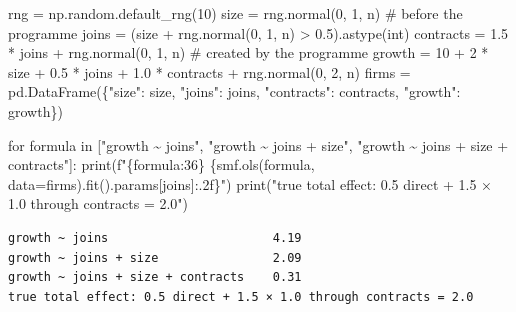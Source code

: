 \documentclass[
  letterpaper,
  10pt,
  twoside,
  openright,
  numbers=noenddot,
  chapterprefix=true]{scrbook}
\newenvironment{Shaded}{}{}
\newcommand{\BuiltInTok}[1]{\textcolor[rgb]{0.84,0.23,0.29}{#1}}
\newcommand{\CommentTok}[1]{\textcolor[rgb]{0.42,0.45,0.49}{#1}}
\newcommand{\ControlFlowTok}[1]{\textcolor[rgb]{0.84,0.23,0.29}{#1}}
\newcommand{\DecValTok}[1]{\textcolor[rgb]{0.00,0.36,0.77}{#1}}
\newcommand{\FloatTok}[1]{\textcolor[rgb]{0.00,0.36,0.77}{#1}}
\newcommand{\KeywordTok}[1]{\textcolor[rgb]{0.84,0.23,0.29}{#1}}
\newcommand{\NormalTok}[1]{\textcolor[rgb]{0.14,0.16,0.18}{#1}}
\newcommand{\OperatorTok}[1]{\textcolor[rgb]{0.14,0.16,0.18}{#1}}
\newcommand{\SpecialCharTok}[1]{\textcolor[rgb]{0.00,0.36,0.77}{#1}}
\newcommand{\SpecialStringTok}[1]{\textcolor[rgb]{0.01,0.18,0.38}{#1}}
\newcommand{\StringTok}[1]{\textcolor[rgb]{0.01,0.18,0.38}{#1}}
\begin{document}
\label{check-mediator}
\begin{Shaded}
\begin{Highlighting}[]
\NormalTok{rng }\OperatorTok{=}\NormalTok{ np.random.default\_rng(}\DecValTok{10}\NormalTok{)}
\NormalTok{size }\OperatorTok{=}\NormalTok{ rng.normal(}\DecValTok{0}\NormalTok{, }\DecValTok{1}\NormalTok{, n)                                  }\CommentTok{\# before the programme}
\NormalTok{joins }\OperatorTok{=}\NormalTok{ (size }\OperatorTok{+}\NormalTok{ rng.normal(}\DecValTok{0}\NormalTok{, }\DecValTok{1}\NormalTok{, n) }\OperatorTok{\textgreater{}} \FloatTok{0.5}\NormalTok{).astype(}\BuiltInTok{int}\NormalTok{)}
\NormalTok{contracts }\OperatorTok{=} \FloatTok{1.5} \OperatorTok{*}\NormalTok{ joins }\OperatorTok{+}\NormalTok{ rng.normal(}\DecValTok{0}\NormalTok{, }\DecValTok{1}\NormalTok{, n)               }\CommentTok{\# created by the programme}
\NormalTok{growth }\OperatorTok{=} \DecValTok{10} \OperatorTok{+} \DecValTok{2} \OperatorTok{*}\NormalTok{ size }\OperatorTok{+} \FloatTok{0.5} \OperatorTok{*}\NormalTok{ joins }\OperatorTok{+} \FloatTok{1.0} \OperatorTok{*}\NormalTok{ contracts }\OperatorTok{+}\NormalTok{ rng.normal(}\DecValTok{0}\NormalTok{, }\DecValTok{2}\NormalTok{, n)}
\NormalTok{firms }\OperatorTok{=}\NormalTok{ pd.DataFrame(\{}\StringTok{"size"}\NormalTok{: size, }\StringTok{"joins"}\NormalTok{: joins, }\StringTok{"contracts"}\NormalTok{: contracts, }\StringTok{"growth"}\NormalTok{: growth\})}

\ControlFlowTok{for}\NormalTok{ formula }\KeywordTok{in}\NormalTok{ [}\StringTok{"growth \textasciitilde{} joins"}\NormalTok{, }\StringTok{"growth \textasciitilde{} joins + size"}\NormalTok{, }\StringTok{"growth \textasciitilde{} joins + size + contracts"}\NormalTok{]:}
    \BuiltInTok{print}\NormalTok{(}\SpecialStringTok{f"}\SpecialCharTok{\{}\NormalTok{formula}\SpecialCharTok{:36\}}\SpecialStringTok{ }\SpecialCharTok{\{}\NormalTok{smf}\SpecialCharTok{.}\NormalTok{ols(formula, data}\OperatorTok{=}\NormalTok{firms)}\SpecialCharTok{.}\NormalTok{fit()}\SpecialCharTok{.}\NormalTok{params[}\StringTok{\textquotesingle{}joins\textquotesingle{}}\NormalTok{]}\SpecialCharTok{:.2f\}}\SpecialStringTok{"}\NormalTok{)}
\BuiltInTok{print}\NormalTok{(}\StringTok{"true total effect: 0.5 direct + 1.5 × 1.0 through contracts = 2.0"}\NormalTok{)}
\end{Highlighting}
\end{Shaded}

\begin{verbatim}
growth ~ joins                       4.19
growth ~ joins + size                2.09
growth ~ joins + size + contracts    0.31
true total effect: 0.5 direct + 1.5 × 1.0 through contracts = 2.0
\end{verbatim}
\end{document}

